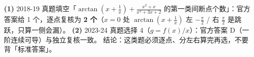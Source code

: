 \begin{notebox}[关于答案的两处已知修正]
\textbf{(1)} 2018-19 真题填空「$\arctan(x+\frac1x)+\frac{x^2+x}{x^2+3x+2}$ 的第一类间断点个数」：官方答案给 1 个，逐点复核为 \textbf{2 个}（$x=0$ 处 $\arctan(x+\frac1x)$ 左 $-\frac\pi2$ / 右 $\frac\pi2$ 是跳跃，只算一侧会漏）。
\textbf{(2)} 2023-24 真题选择 4（$g=f(x)/x$）：官方答案 D（一阶连续可导）与独立复核一致。
结论：这类题必须逐点、分左右算完再选，不要背「标准答案」。
\end{notebox}


